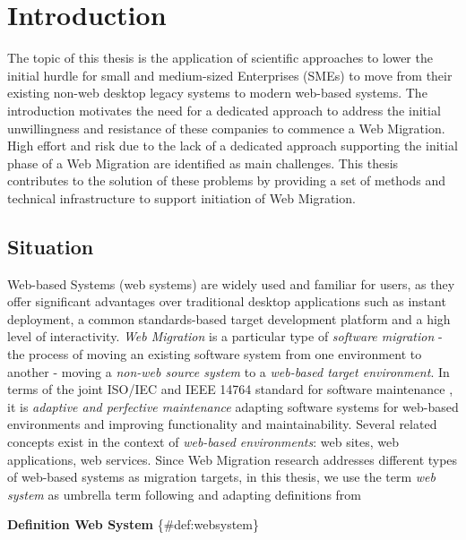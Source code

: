 \hypertarget{introduction}{%
\chapter{Introduction}\label{introduction}}

The topic of this thesis is the application of scientific approaches to lower the initial hurdle for small and medium-sized Enterprises (SMEs) to move from their existing non-web desktop legacy systems to modern web-based systems.
The introduction motivates the need for a dedicated approach to address the initial unwillingness and resistance of these companies to commence a Web Migration.
High effort and risk due to the lack of a dedicated approach supporting the initial phase of a Web Migration are identified as main challenges.
This thesis contributes to the solution of these problems by providing a set of methods and technical infrastructure to support initiation of Web Migration.

\hypertarget{sec:situation}{%
\section{Situation}\label{sec:situation}}

Web-based Systems (web systems) are widely used and familiar for users, as they offer significant advantages over traditional desktop applications such as instant deployment, a common standards-based target development platform and a high level of interactivity.
\emph{Web Migration} is a particular type of \emph{software migration} - the process of moving an existing software system from one environment to another \autocite{SWEBOK2014} - moving a \emph{non-web source system} to a \emph{web-based target environment}.
In terms of the joint ISO/IEC and IEEE 14764 standard for software maintenance \autocite{ISO/IEEE2006SoftwareLifeCycle}, it is \emph{adaptive and perfective maintenance} adapting software systems for web-based environments and improving functionality and maintainability.
Several related concepts exist in the context of \emph{web-based environments}: web sites, web applications, web services.
Since Web Migration research addresses different types of web-based systems as migration targets, in this thesis, we use the term \emph{web system} as umbrella term following \autocite{Kienle2014EvolutionWeb} and adapting definitions from \autocite{Gaedke2000Diss,Kappel2006WebEngineering}

\textbf{Definition Web System} \{\#def:websystem\}

